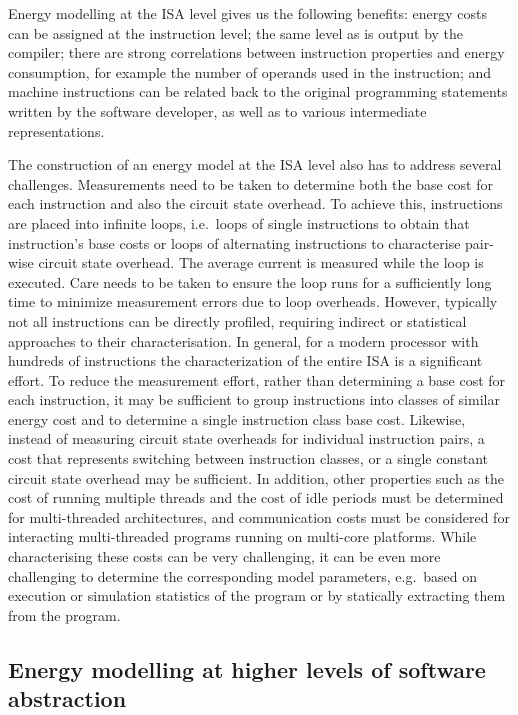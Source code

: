Energy modelling at the ISA level gives us the following benefits: energy
costs can be assigned at the instruction level; the same level as is output by
the compiler; there are strong correlations between instruction properties and
energy consumption, for example the number of operands used in the instruction;
and machine instructions can be related back to the original programming
statements written by the software developer, as well as to various
intermediate representations. 

The construction of an energy model at the ISA level also has to address several
challenges.
%
Measurements need to be taken to determine both the base cost for each
instruction and also the circuit state overhead. To achieve this, instructions
are placed into infinite loops, i.e.\ loops of single instructions to obtain
that instruction's base costs or loops of alternating instructions to
characterise pair-wise circuit state overhead. The average current is measured
while the loop is executed. Care needs to be taken to ensure the loop runs for
a sufficiently long time to minimize measurement errors due to loop overheads.
%
However, typically not all instructions can be directly profiled, requiring
indirect or statistical approaches to their characterisation.
%
In general, for a modern processor with hundreds of instructions the
characterization of the entire ISA is a significant effort.
%
To reduce the measurement effort, rather than determining a base cost for each
instruction, it may be sufficient to group instructions into classes of similar
energy cost and to determine a single instruction class base cost. Likewise,
instead of measuring circuit state overheads for individual instruction pairs,
a cost that represents switching between instruction classes, or a single
constant circuit state overhead may be sufficient.
%
In addition, other properties such as the cost of running multiple threads and
the cost of idle periods must be determined for multi-threaded architectures,
and communication costs must be considered for interacting multi-threaded
programs running on multi-core platforms. 
%
While characterising these costs can be very challenging, it can be even more
challenging to determine the corresponding model parameters, e.g.\ based on
execution or simulation statistics of the program or by statically extracting
them from the program.

\subsection{Energy modelling at higher levels of software abstraction}
\label{subsec:mapping}

